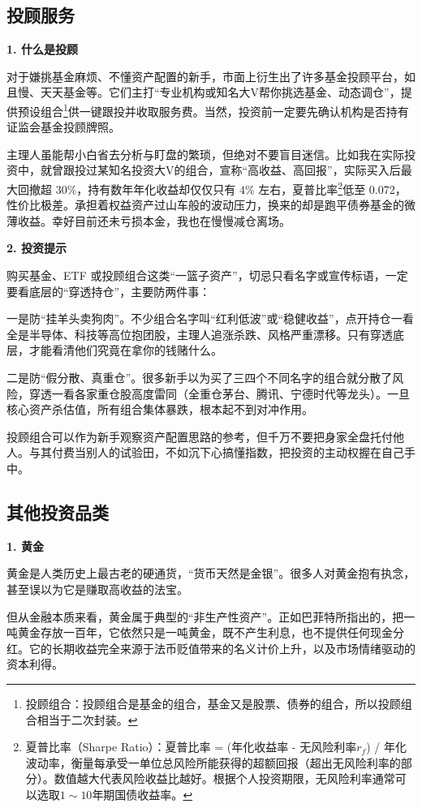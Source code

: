 \documentclass[12pt,openany]{book}
\newcommand{\subhead}[1]{%
    \par\vspace{0.5\baselineskip}%
    \noindent\textbf{#1}\par%
    \vspace{0.5\baselineskip}%
}
\begin{document}
\subsection{投顾服务}

\subhead{1. 什么是投顾}

对于嫌挑基金麻烦、不懂资产配置的新手，市面上衍生出了许多基金投顾平台，如且慢、天天基金等。它们主打“专业机构或知名大V帮你挑选基金、动态调仓”，提供预设组合\footnote{投顾组合：投顾组合是基金的组合，基金又是股票、债券的组合，所以投顾组合相当于二次封装。}供一键跟投并收取服务费。当然，投资前一定要先确认机构是否持有证监会基金投顾牌照。

主理人虽能帮小白省去分析与盯盘的繁琐，但绝对不要盲目迷信。比如我在实际投资中，就曾跟投过某知名投资大V的组合，宣称“高收益、高回报”，实际买入后最大回撤超 $30\%$，持有数年年化收益却仅仅只有 $4\%$ 左右，夏普比率\footnote{夏普比率（Sharpe Ratio）：夏普比率 = (年化收益率 - 无风险利率$r_f$) / 年化波动率，衡量每承受一单位总风险所能获得的超额回报（超出无风险利率的部分）。数值越大代表风险收益比越好。根据个人投资期限，无风险利率通常可以选取$1 \sim 10$年期国债收益率。}低至 0.072，性价比极差。承担着权益资产过山车般的波动压力，换来的却是跑平债券基金的微薄收益。幸好目前还未亏损本金，我也在慢慢减仓离场。

\subhead{2. 投资提示}

购买基金、ETF 或投顾组合这类“一篮子资产”，切忌只看名字或宣传标语，一定要看底层的“穿透持仓”，主要防两件事：

一是防“挂羊头卖狗肉”。不少组合名字叫“红利低波”或“稳健收益”，点开持仓一看全是半导体、科技等高位抱团股，主理人追涨杀跌、风格严重漂移。只有穿透底层，才能看清他们究竟在拿你的钱赌什么。

二是防“假分散、真重仓”。很多新手以为买了三四个不同名字的组合就分散了风险，穿透一看各家重仓股高度雷同（全重仓茅台、腾讯、宁德时代等龙头）。一旦核心资产杀估值，所有组合集体暴跌，根本起不到对冲作用。

投顾组合可以作为新手观察资产配置思路的参考，但千万不要把身家全盘托付他人。与其付费当别人的试验田，不如沉下心搞懂指数，把投资的主动权握在自己手中。

\subsection{其他投资品类}

\subhead{1. 黄金}

黄金是人类历史上最古老的硬通货，“货币天然是金银”。很多人对黄金抱有执念，甚至误以为它是赚取高收益的法宝。

但从金融本质来看，黄金属于典型的“非生产性资产”。正如巴菲特所指出的，把一吨黄金存放一百年，它依然只是一吨黄金，既不产生利息，也不提供任何现金分红。它的长期收益完全来源于法币贬值带来的名义计价上升，以及市场情绪驱动的资本利得。
\end{document}
